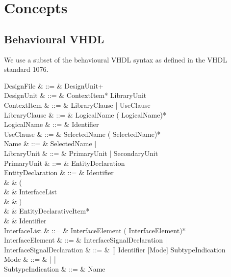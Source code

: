 \section{Concepts}
\label{sec:vhdl-concepts}

\subsection{Behavioural VHDL}
\label{sec:vhdl-behavioural}
We use a subset of the behavioural VHDL syntax as defined in the VHDL standard 1076.

\begin{VHDLcode}[\footnotesize]
  DesignFile & ::= & DesignUnit+ \\
  DesignUnit & ::= & ContextItem* LibraryUnit \\
  ContextItem & ::= & LibraryClause | UseClause \\
  LibraryClause & ::= & \VHDLLIBRARY{} LogicalName (\VHDLComma{} LogicalName)*\VHDLSemicolon \\
  LogicalName & ::= & Identifier \\
  UseClause & ::= & \VHDLUSE{} SelectedName (\VHDLComma{} SelectedName)*\VHDLSemicolon \\
  Name & ::= & SelectedName | \\
  LibraryUnit & ::= & PrimaryUnit | SecondaryUnit \\
  PrimaryUnit & ::= & EntityDeclaration \\
  EntityDeclaration & ::= & \VHDLENTITY{} Identifier \VHDLIS \\
                              &      & \VHDLTab \VHDLPORT{} ( \\
                              &      & \VHDLTab \VHDLTab InterfaceList \\
                              &      & \VHDLTab ) \\
                              &      & \VHDLTab EntityDeclarativeItem* \\
                              &      & \VHDLEND{} Identifier \\
  InterfaceList & ::=  & InterfaceElement (\VHDLSemicolon{} InterfaceElement)* \\
  InterfaceElement & ::= & InterfaceSignalDeclaration | \\
  InterfaceSignalDeclaration & ::= & [\VHDLSIGNAL] Identifier [Mode] SubtypeIndication \\
  Mode & ::= & \VHDLIN{} | \VHDLOUT{} | \VHDLINOUT \\
  SubtypeIndication & ::= & Name \\

\end{VHDLcode}
